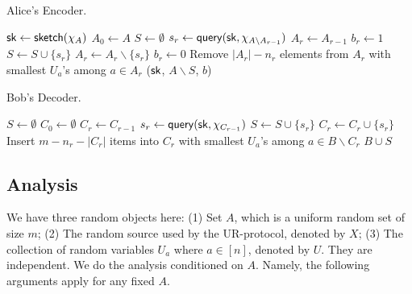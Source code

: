\begin{algorithm}[H] 
  \caption{Alice's Encoder.} \label{algo:enc}
  \begin{algorithmic}[1]
    \State $\mathsf{sk}\leftarrow \mathsf{sketch}(\chi_A)$
    \State $A_0 \leftarrow A$
    \State $S\leftarrow \emptyset$
      \State $s_r\leftarrow \mathsf{query}(\mathsf{sk}, \chi_{A\backslash A_{r-1}})$
      \State $A_r\leftarrow A_{r-1}$
       
        \State $b_r\leftarrow 1$ 
        \State $S\leftarrow S \cup \{s_r\}$
        \State $A_r\leftarrow A_r \backslash \{s_r\}$
      \Else 
        \State $b_r\leftarrow 0$
      \EndIf
      \State Remove $|A_r|-n_r$ elements from $A_r$ with smallest $U_a$'s among $a\in A_r$ 
    \EndFor
    \State \Return ($\mathsf{sk}$, $A\backslash S$, $b$) 
    \EndProcedure
  \end{algorithmic}
\end{algorithm}

\begin{algorithm}[H] 
  \caption{Bob's Decoder.} \label{algo:dec}
  \begin{algorithmic}[1]
    \State $S\leftarrow \emptyset$
    \State $C_0 \leftarrow \emptyset$
      \State $C_r\leftarrow C_{r-1}$
        \State $s_r\leftarrow \mathsf{query}(\mathsf{sk}, \chi_{C_{r-1}})$ 
        \State $S\leftarrow S \cup \{s_r\}$
        \State $C_r\leftarrow C_r \cup \{s_r\}$
      \EndIf
       \State Insert $m-n_r-|C_r|$ items into $C_r$ with smallest $U_a$'s among $a\in B\backslash C_r$
    \EndFor
    \State \Return $B\cup S$ 
    \EndProcedure
  \end{algorithmic}
\end{algorithm}

\subsection{Analysis}

We have three random objects here: (1) Set $A$, which is a uniform random set of size $m$; (2) The random source used by the UR-protocol, denoted by $X$; (3) The collection of random variables $U_a$ where $a\in [n]$, denoted by $U$. They are independent. We do the analysis conditioned on $A$. Namely, the following arguments apply for any fixed $A$. 

